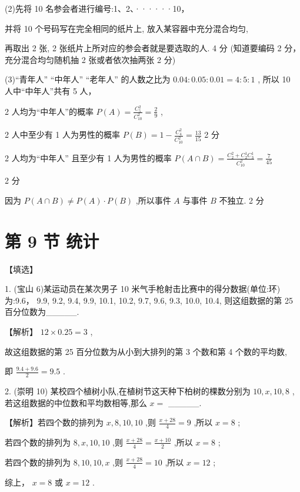 \documentclass[10pt]{article}
\begin{document}
(2)先将 10 名参会者进行编号:1、2、······10，

并将 10 个号码写在完全相同的纸片上, 放入某容器中充分混合均匀,

再取出 2 张, 2 张纸片上所对应的参会者就是要选取的人. 4 分 (知道要编码 2 分，充分混合均匀随机抽 2 张或者依次抽两张 2 分)

(3)“青年人” “中年人” “老年人” 的人数之比为 \({0.04} : {0.05} : {0.01} = 4 : 5 : 1\) , 所以 10 人中“中年人”共有 5 人，

2 人均为“中年人”的概率 \(P\left( A\right)  = \frac{{C}_{5}^{2}}{{C}_{10}^{2}} = \frac{2}{9}\) ,

2 人中至少有 1 人为男性的概率 \(P\left( B\right)  = 1 - \frac{{C}_{4}^{2}}{{C}_{10}^{2}} = \frac{13}{15}\) 2 分

2 人均为“中年人” 且至少有 1 人为男性的概率 \(P\left( {A \cap  B}\right)  = \frac{{C}_{2}^{2} + {C}_{2}^{1}{C}_{3}^{1}}{{C}_{10}^{2}} = \frac{7}{45}\)

2 分

因为 \(P\left( {A \cap  B}\right)  \neq  P\left( A\right)  \cdot  P\left( B\right)\) ,所以事件 \(A\) 与事件 \(B\) 不独立. 2 分

\section*{第 9 节 统计}

【填选】

1. (宝山 6)某运动员在某次男子 10 米气手枪射击比赛中的得分数据(单位:环)为:9.6， 9.9, 9.2, 9.4, 9.9, 10.1, 10.2, 9.7, 9.6, 9.3, 10.0, 10.4, 则这组数据的第 25 百分位数为\_\_\_\_\_.

【解析】 \({12} \times  {0.25} = 3\) ,

故这组数据的第 25 百分位数为从小到大排列的第 3 个数和第 4 个数的平均数,

即 \(\frac{{9.4} + {9.6}}{2} = {9.5}\) .

2. (崇明 10) 某校四个植树小队,在植树节这天种下柏树的棵数分别为 \({10},x,{10},8\) ,若这组数据的中位数和平均数相等,那么 \(x =\) \_\_\_\_\_.

【解析】若四个数的排列为 \(x,8,{10},{10}\) ,则 \(\frac{x + {28}}{4} = 9\) ,所以 \(x = 8\) ;

若四个数的排列为 \(8,x,{10},{10}\) ,则 \(\frac{x + {28}}{4} = \frac{x + {10}}{2}\) ,所以 \(x = 8\) ;

若四个数的排列为 \(8,{10},{10},x\) ,则 \(\frac{x + {28}}{4} = {10}\) ,所以 \(x = {12}\) ;

综上， \(x = 8\) 或 \(x = {12}\) .
\end{document}
